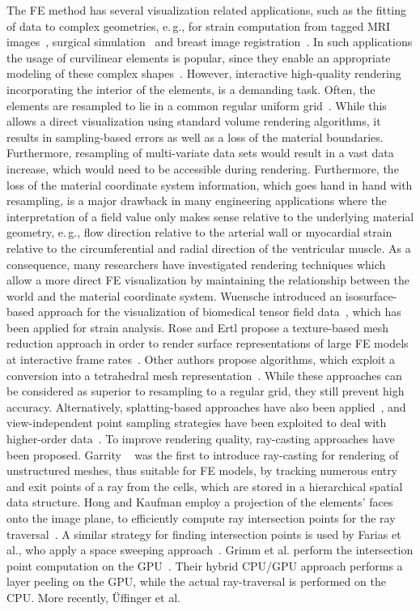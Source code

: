 \documentclass[review,journal]{vgtc}         %
\begin{document}
The FE method has several visualization related applications, such as the fitting of data to complex geometries, e.\,g., for strain computation from tagged MRI images~\cite{Young00}, surgical simulation~\cite{Berkley04} and breast image registration~\cite{lee10deformation}. In such applications the usage of curvilinear elements is popular, since they enable an appropriate modeling of these complex shapes~\cite{gelberg90visTechGrid,smith05ventricularmechanics}. However, interactive high-quality rendering incorporating the interior of the elements, is a demanding task. Often, the elements are resampled to lie in a common regular uniform grid~\cite{Wihelms90}. While this allows a direct visualization using standard volume rendering algorithms, it results in sampling-based errors as well as a loss of the material boundaries. Furthermore, resampling of multi-variate data sets would result in a vast data increase, which would need to be accessible during rendering. Furthermore, the loss of the material coordinate system information, which goes hand in hand with resampling, is a major drawback in many engineering applications where the interpretation of a field value only makes sense relative to the underlying material geometry, e.\,g., flow direction relative to the arterial wall or myocardial strain relative to the circumferential and radial direction of the ventricular muscle. As a consequence, many researchers have investigated rendering techniques which allow a more direct FE visualization by maintaining the relationship between the world and the material coordinate system. Wuensche introduced an isosurface-based approach for the visualization of biomedical tensor field data~\cite{wunsche03femvis}, which has been applied for strain analysis. Rose and Ertl propose a texture-based mesh reduction approach in order to render surface representations of large FE models at interactive frame rates~\cite{rose03femvis}. Other authors propose algorithms, which exploit a conversion into a tetrahedral mesh representation~\cite{marmitt05femtess,schroeder06femtess}. While these approaches can be considered as superior to resampling to a regular grid, they still prevent high accuracy. Alternatively, splatting-based approaches have also been applied~\cite{mao95femsplatting}, and view-independent point sampling strategies have been exploited to deal with higher-order data~\cite{zhou06pointbased}. To improve rendering quality, ray-casting approaches have been proposed. Garrity ~\cite{garrity90RaytracingIrregular} was the first to introduce ray-casting for rendering of unstructured meshes, thus suitable for FE models, by tracking numerous entry and exit points of a ray from the cells, which are stored in a hierarchical spatial data structure. Hong and Kaufman employ a projection of the elements' faces onto the image plane, to efficiently compute ray intersection points for the ray traversal~\cite{hong99curvilinear}. A similar strategy for finding intersection points is used by Farias et al., who apply a space sweeping approach~\cite{farias00zsweep}. Grimm et al. perform the intersection point computation on the GPU~\cite{grimm04curvilinear}. Their hybrid CPU/GPU approach performs a layer peeling on the GPU, while the actual ray-traversal is performed on the CPU. More recently, {\"U}ffinger et al. 
\end{document}
